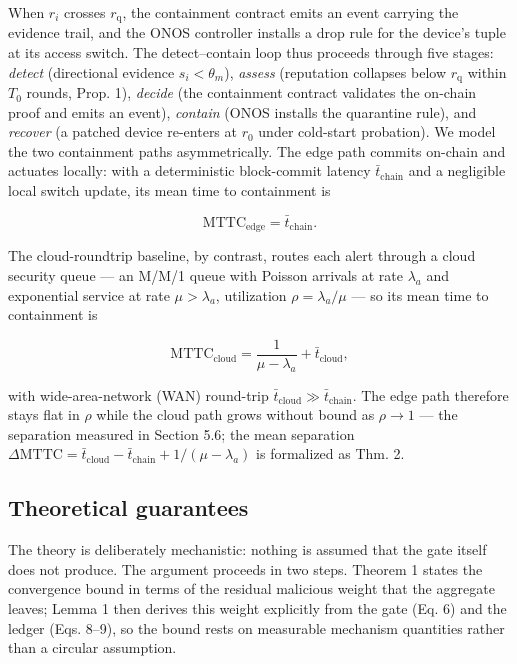 \documentclass[cmc,article,submit,moreauthors,pdftex]{Definitions/tsp}
\begin{document}
When $r_i$ crosses $r_{\mathrm{q}}$, the containment contract emits an event carrying the evidence trail, and the ONOS controller installs a drop rule for the device's tuple at its access switch. The detect--contain loop thus proceeds through five stages: \emph{detect} (directional evidence $s_i < \theta_m$), \emph{assess} (reputation collapses below $r_{\mathrm{q}}$ within $T_0$ rounds, Prop. 1), \emph{decide} (the containment contract validates the on-chain proof and emits an event), \emph{contain} (ONOS installs the quarantine rule), and \emph{recover} (a patched device re-enters at $r_0$ under cold-start probation). We model the two containment paths asymmetrically. The edge path commits on-chain and actuates locally: with a deterministic block-commit latency $\bar{t}_{\mathrm{chain}}$ and a negligible local switch update, its mean time to containment is

\begin{equation}
\mathrm{MTTC}_{\mathrm{edge}} = \bar{t}_{\mathrm{chain}}.
\tag{12}
\end{equation}

The cloud-roundtrip baseline, by contrast, routes each alert through a cloud security queue --- an M/M/1 queue with Poisson arrivals at rate $\lambda_a$ and exponential service at rate $\mu > \lambda_a$, utilization $\rho = \lambda_a/\mu$ --- so its mean time to containment is

\begin{equation}
\mathrm{MTTC}_{\mathrm{cloud}} = \frac{1}{\mu - \lambda_a} + \bar{t}_{\mathrm{cloud}},
\tag{13}
\end{equation}

with wide-area-network (WAN) round-trip $\bar{t}_{\mathrm{cloud}} \gg \bar{t}_{\mathrm{chain}}$. The edge path therefore stays flat in $\rho$ while the cloud path grows without bound as $\rho \to 1$ --- the separation measured in Section 5.6; the mean separation $\Delta\mathrm{MTTC} = \bar{t}_{\mathrm{cloud}} - \bar{t}_{\mathrm{chain}} + 1/(\mu-\lambda_a)$ is formalized as Thm. 2.

\subsection{Theoretical guarantees}\label{sec:theoretical-guarantees}

The theory is deliberately mechanistic: nothing is assumed that the gate itself does not produce. The argument proceeds in two steps. Theorem 1 states the convergence bound in terms of the residual malicious weight that the aggregate leaves; Lemma 1 then derives this weight explicitly from the gate (Eq. 6) and the ledger (Eqs. 8--9), so the bound rests on measurable mechanism quantities rather than a circular assumption.
\end{document}
